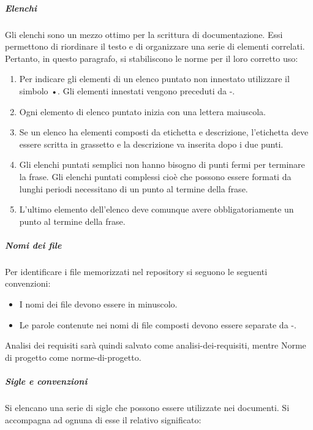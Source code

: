 \documentclass[../norme-di-progetto.tex]{subfiles}
\begin{document}
\subparagraph{Elenchi }%
\label{subp:elenchi}
Gli elenchi sono un mezzo ottimo per la scrittura di documentazione. Essi permettono di riordinare il testo e di organizzare una serie di elementi correlati. Pertanto, in questo paragrafo, si stabiliscono le norme per il loro corretto uso:

\begin{enumerate}
  \item Per indicare gli elementi di un elenco puntato non innestato utilizzare il simbolo •. Gli elementi innestati vengono preceduti da -.
  \item Ogni elemento di elenco puntato inizia con una lettera maiuscola.
  \item Se un elenco ha elementi composti da etichetta e descrizione, l'etichetta deve essere scritta in grassetto e la descrizione va inserita dopo i due punti.
  \item Gli elenchi puntati semplici non hanno bisogno di punti fermi per terminare la frase. Gli elenchi puntati complessi cioè che possono essere formati da lunghi periodi necessitano di un punto al termine della frase.
  \item L'ultimo elemento dell'elenco deve comunque avere obbligatoriamente un punto al termine della frase.
\end{enumerate}

\subparagraph{Nomi dei file}%
\label{nomi_dei_file}
Per identificare i file memorizzati nel repository si seguono le seguenti convenzioni:

\begin{itemize}
  \item I nomi dei file devono essere in minuscolo.
  \item Le parole contenute nei nomi di file composti devono essere separate da -.
\end{itemize}

Analisi dei requisiti sarà quindi salvato come analisi-dei-requisiti, mentre Norme di progetto come norme-di-progetto.

\subparagraph{Sigle e convenzioni}%
\label{sigle_e_convenzioni}
Si elencano una serie di sigle che possono essere utilizzate nei documenti. Si accompagna ad ognuna di esse il relativo significato:
\end{document}
